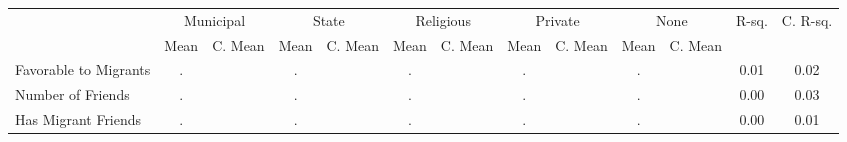 \begin{tabular}{l c c c c c c c c c c c c}
\toprule
& \multicolumn{2}{c}{Municipal} & \multicolumn{2}{c}{State} & \multicolumn{2}{c}{Religious} & \multicolumn{2}{c}{Private} & \multicolumn{2}{c}{None} & R-sq. & C. R-sq. \\
& \scriptsize Mean & \scriptsize C. Mean & \scriptsize Mean & \scriptsize C. Mean & \scriptsize Mean & \scriptsize C. Mean & \scriptsize Mean & \scriptsize C. Mean & \scriptsize Mean & \scriptsize C. Mean & & \\
\midrule
Favorable to Migrants &         . & &         . & &         . & &         . & &         . & &      0.01 &      0.02 \\
Number of Friends &         . & &         . & &         . & &         . & &         . & &      0.00 &      0.03 \\
Has Migrant Friends &         . & &         . & &         . & &         . & &         . & &      0.00 &      0.01 \\
\bottomrule
\end{tabular}
